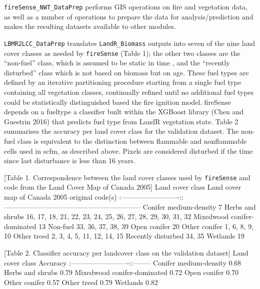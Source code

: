 \documentclass[]{article}
\begin{document}
\texttt{fireSense\_NWT\_DataPrep} performs GIS operations on fire and
vegetation data, as well as a number of operations to prepare the data
for analysis/prediction and makes the resulting datasets available to
other modules.

\texttt{LBMR2LCC\_DataPrep} translates \texttt{LandR\_Biomass} outputs
into seven of the nine land cover classes as needed by
\texttt{fireSense} (Table 1); the other two classes are the ``non-fuel''
class, which is assumed to be static in time , and the ``recently
disturbed'' class which is not based on biomass but on age. These fuel
types are defined by an iterative partitioning procedure starting from a
single fuel type containing all vegetation classes, continually refined
until no additional fuel types could be statistically distinguished
based the fire ignition model. fireSense depends on a fueltype a
classifier built within the XGBoost library (Chen and Guestrin 2016)
that predicts fuel type from LandR vegetation state. Table 2 summarises
the accuracy per land cover class for the validation dataset. The
non-fuel class is equivalent to the distinction between flammable and
nonflammable cells used in scfm, as described above. Pixels are
considered disturbed if the time since last disturbance is less than 16
years.

{[}Table 1. Correspondence between the land cover classes used by
\texttt{fireSense} and code from the Land Cover Map of Canada 2005{]}
\textbar{}Land cover class \textbar{} Land cover map of Canada 2005
original code(s) \textbar{}
\textbar{}:-------------------------:\textbar{}:-----------------------------------------------------------\textbar{}
\textbar{}Conifer medium-density \textbar{} 7 \textbar{} \textbar{}Herbs
and shrubs \textbar{} 16, 17, 18, 21, 22, 23, 24, 25, 26, 27, 28, 29,
30, 31, 32 \textbar{} \textbar{}Mixedwood conifer-dominated\textbar{} 13
\textbar{} \textbar{}Non-fuel \textbar{} 33, 36, 37, 38, 39 \textbar{}
\textbar{}Open conifer \textbar{} 20 \textbar{} \textbar{}Other conifer
\textbar{} 1, 6, 8, 9, 10 \textbar{} \textbar{}Other treed \textbar{} 2,
3, 4, 5, 11, 12, 14, 15 \textbar{} \textbar{}Recently disturbed
\textbar{} 34, 35 \textbar{} \textbar{}Wetlands \textbar{} 19 \textbar{}

{[}Table 2. Classifier accuracy per landcover class on the validation
dataset{]} \textbar{}Land cover class \textbar{} Accuracy\textbar{}
\textbar{}:-------------------------:\textbar{}:--------\textbar{}
\textbar{}Conifer medium-density \textbar{} 0.68 \textbar{}
\textbar{}Herbs and shrubs \textbar{} 0.79 \textbar{}
\textbar{}Mixedwood conifer-dominated\textbar{} 0.72 \textbar{}
\textbar{}Open conifer \textbar{} 0.70 \textbar{} \textbar{}Other
conifer \textbar{} 0.57 \textbar{} \textbar{}Other treed \textbar{} 0.79
\textbar{} \textbar{}Wetlands \textbar{} 0.82 \textbar{}
\end{document}
